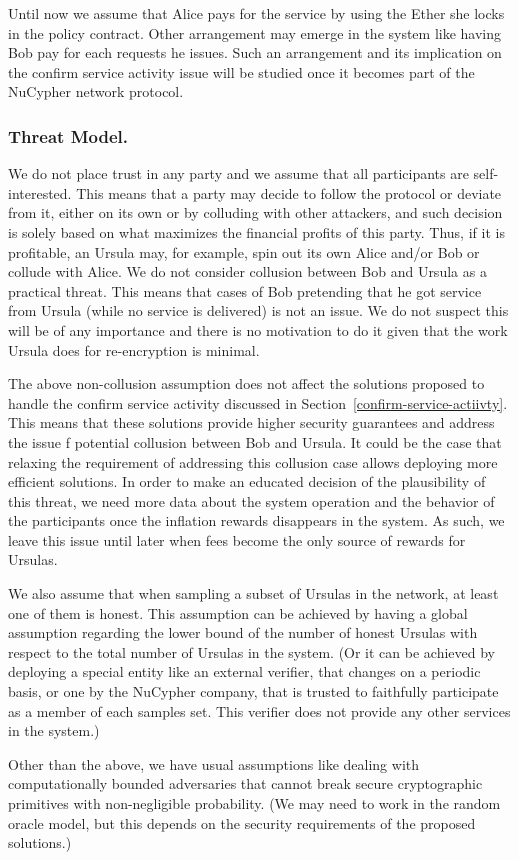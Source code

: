 Until now we assume that Alice pays for the service by using the Ether she locks 
in the policy contract. Other arrangement may emerge in the system like having 
Bob pay for each requests he issues. Such an arrangement and its implication on the 
confirm service activity issue will be studied once it becomes part of the NuCypher 
network protocol.


\subsubsection{Threat Model.}
We do not place trust in any party and we assume that all participants are 
self-interested. This means that a party may decide to 
follow the protocol or deviate from it, either on its own or by colluding 
with other attackers, and such decision is solely based on what maximizes the financial profits
of this party. Thus, if it is profitable, an Ursula may, for example, spin out  
its own Alice and/or Bob or collude with Alice. We do not consider collusion 
between Bob and Ursula as a practical threat. This means that cases of Bob pretending  
that he got service from Ursula (while no service is delivered) is not an issue. We do not 
suspect this will be of any importance and there is no motivation to do it given that 
the work Ursula does for re-encryption is minimal.


The above non-collusion assumption does not affect the solutions proposed to handle 
the confirm service activity discussed in Section~\ref{confirm-service-actiivty}. This 
means that these solutions provide higher 
security guarantees and address the issue f potential collusion between Bob and Ursula. 
It could be the case that relaxing the requirement of 
addressing this collusion case allows deploying more efficient solutions. 
In order to make an educated decision of the plausibility of this threat, we need 
more data about the system operation and the behavior of the participants 
once the inflation rewards disappears in the system. As such, we leave this 
issue until later when fees become the only source of rewards for Ursulas. 


We also assume that when sampling a subset of Ursulas in the network, 
at least one of them is honest. This assumption can be achieved by 
having a global assumption regarding the lower bound of the number of 
honest Ursulas with respect to the total number of Ursulas in the system. 
(Or it can be achieved by deploying a special entity like an external verifier, 
that changes on a periodic basis, or one by the NuCypher company, that is
trusted to faithfully participate as a member of each samples set. This 
verifier does not provide any other services 
in the system.)


Other than the above, we have usual assumptions like dealing with 
computationally bounded adversaries 
that cannot break secure cryptographic primitives with non-negligible probability. 
(We may need to work in the random oracle model, but this depends on the 
security requirements of the proposed solutions.)




